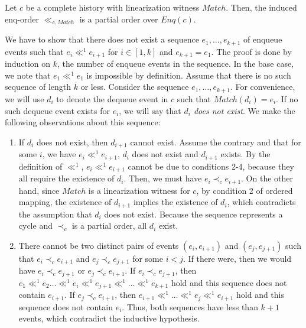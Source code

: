 \documentclass{LMCS}
\newcommand{\Match}{\ensuremath{\mathit{Match}}}
\newcommand{\Enq}[1]{\ensuremath{\mathit{Enq}({#1})}}
\newcommand\mylabel[1]{\label{#1}}
\begin{document}
\begin{lem}\mylabel{ref:enq-order-total}
Let $c$ be a complete history with linearization witness $\Match$.
Then, the induced enq-order $\ll_{c,\Match}$ is a partial order over $\Enq c$.
\end{lem}
\proof
We have to show that there does not exist a sequence $e_1,\ldots,e_{k+1}$ of enqueue events such that $e_i\ll^1 e_{i+1}$ for $i\in[1,k]$ and $e_{k+1}= e_1$.
The proof is done by induction on $k$, the number of enqueue events in the sequence.
In the base case, we note that $e_1\ll^1 e_1$ is impossible by definition.
Assume that there is no such sequence of length $k$ or less.
Consider the sequence $e_1,\ldots,e_{k+1}$.
For convenience, we will use $d_i$ to denote the dequeue event in $c$ such that $\Match(d_i)=e_i$. 
If no such dequeue event exists for $e_i$, we will say that {\em $d_i$ does not exist}.
We make the following observations about this sequence:

\begin{enumerate}
\item If $d_i$ does not exist, then $d_{i+1}$ cannot exist.
Assume the contrary and that for some $i$, we have $e_i\ll^1 e_{i+1}$, $d_i$ does not exist and $d_{i+1}$ exists.
By the definition of $\ll^1$, $e_i\ll^1 e_{i+1}$ cannot be due to conditions 2-4, because they all require the existence of $d_i$.
Then, we must have $e_i \prec_c e_{i+1}$.
On the other hand, since $\Match$ is a linearization witness for $c$, by condition 2 of ordered mapping, the existence of $d_{i+1}$ implies the existence of $d_i$, which contradicts the assumption that $d_i$ does not exist.
Because the sequence represents a cycle and $\prec_c$ is a partial order, all $d_i$ exist.

\item There cannot be two distinct pairs of events $(e_i,e_{i+1})$ and $(e_j,e_{j+1})$ such that $e_i\prec_c e_{i+1}$ and $e_j\prec_c e_{j+1}$ for some $i<j$.
If there were, then we would have $e_i \prec_c e_{j+1}$ or $e_j \prec_c e_{i+1}$.
If $e_i\prec_c e_{j+1}$, then $e_1\ll^1 e_2\ldots \ll^1 e_i \ll^1 e_{j+1}\ll^1\ldots \ll^1 e_{k+1}$ hold and this sequence does not contain $e_{i+1}$.
If $e_j\prec_c e_{i+1}$, then $e_{i+1}\ll^1 \ldots \ll^1 e_j \ll^1 e_{i+1}$ hold and this sequence does not contain $e_i$.
Thus, both sequences have less than $k+1$ events, which contradict the inductive hypothesis.
\end{enumerate}
\end{document}
